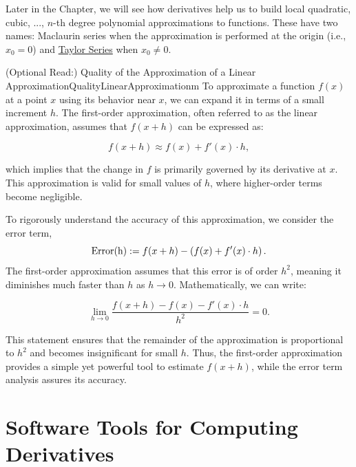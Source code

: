 Later in the Chapter, we will see how derivatives help us to build local quadratic, cubic, ..., $n$-th degree polynomial approximations to functions. These have two names: Maclaurin series when the approximation is performed at the origin (i.e., $x_0 = 0$) and \href{https://en.wikipedia.org/wiki/Taylor_series}{Taylor Series} when $x_0 \neq 0$. 

\bigskip

\begin{factColor}{(Optional Read:) Quality of the Approximation of a Linear Approximation}{QualityLinearApproximationm}
To approximate a function \( f(x) \) at a point \( x \) using its behavior near \( x \), we can expand it in terms of a small increment \( h \). The first-order approximation, often referred to as the linear approximation, assumes that \( f(x+h) \) can be expressed as:

\[
f(x+h) \approx f(x) + f'(x) \cdot h,
\]

which implies that the change in \( f \) is primarily governed by its derivative at \( x \). This approximation is valid for small values of \( h \), where higher-order terms become negligible. 

To rigorously understand the accuracy of this approximation, we consider the error term,
\[
{\rm Error(h)} := f(x+h) - \left(f(x) + f'(x) \cdot h\right).
\]
The first-order approximation assumes that this error is of order \( h^2 \), meaning it diminishes much faster than \( h \) as \( h \to 0 \). Mathematically, we can write:

\[
\lim_{h \to 0} \frac{f(x+h) - f(x) - f'(x) \cdot h}{h^2} = 0.
\]

This statement ensures that the remainder of the approximation is proportional to \( h^2 \) and becomes insignificant for small \( h \). Thus, the first-order approximation provides a simple yet powerful tool to estimate \( f(x+h) \), while the error term analysis assures its accuracy.
\end{factColor}



\section{Software Tools for Computing Derivatives}

